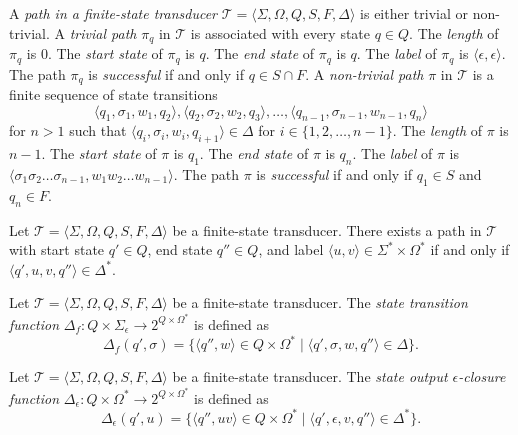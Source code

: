 \begin{definition}
  A \emph{path in a finite-state transducer} $\mathcal{T} = \langle \Sigma, \Omega,
  Q, S, F, \Delta \rangle$ is either trivial or non-trivial. A \emph{trivial path} $\pi_q$
  in $\mathcal{T}$ is associated with every state $q \in Q$. The \emph{length} of $\pi_q$ is
  $0$. The \emph{start state} of $\pi_q$ is $q$. The \emph{end state} of $\pi_q$ is $q$. The \emph{label}
  of $\pi_q$ is $\langle \epsilon, \epsilon \rangle$. The path $\pi_q$ is \emph{successful}
  if and only if $q \in S \cap F$. A \emph{non-trivial path} $\pi$ in $\mathcal{T}$ is a
  finite sequence of state transitions
  \begin{equation*}
    \langle q_1, \sigma_1, w_1, q_2 \rangle, \langle q_2, \sigma_2, w_2, q_3 \rangle,
    \ldots, \langle q_{n-1}, \sigma_{n-1}, w_{n-1}, q_n \rangle
  \end{equation*}
  for $n > 1$ such that $\langle q_i, \sigma_i, w_i, q_{i+1} \rangle \in \Delta$ for
  $i \in \{ 1, 2, \ldots, n-1 \}$. The \emph{length} of $\pi$ is $n-1$. The \emph{start state} of
  $\pi$ is $q_1$. The \emph{end state} of $\pi$ is $q_n$. The \emph{label} of $\pi$ is $\langle
  \sigma_1 \sigma_2 \ldots \sigma_{n-1}, w_1 w_2 \ldots w_{n-1} \rangle$. The path
  $\pi$ is \emph{successful} if and only if $q_1 \in S$ and $q_n \in F$.
\end{definition}

\begin{proposition}
  Let $\mathcal{T} = \langle \Sigma, \Omega, Q, S, F, \Delta \rangle$ be a
  finite-state transducer. There exists a path in $\mathcal{T}$ with start state $q'
  \in Q$, end state $q'' \in Q$, and label $\langle u, v \rangle \in \Sigma^* \times
  \Omega^*$ if and only if $\langle q', u, v, q'' \rangle \in \Delta^*$.
\end{proposition}

\begin{definition}
  Let $\mathcal{T} = \langle \Sigma, \Omega, Q, S, F, \Delta \rangle$ be a
  finite-state transducer. The \emph{state transition function} $\Delta_f : Q \times
  \Sigma_\epsilon \rightarrow 2^{Q \times \Omega^*}$ is defined as
  \begin{equation*}
    \Delta_f(q', \sigma) = \{ \langle q'', w \rangle \in Q \times \Omega^* \mid
    \langle q', \sigma, w, q'' \rangle \in \Delta \}.
  \end{equation*}
\end{definition}

\begin{definition}
  Let $\mathcal{T} = \langle \Sigma, \Omega, Q, S, F, \Delta \rangle$ be a
  finite-state transducer. The \emph{state output $\epsilon$-closure function}
  $\Delta_\epsilon : Q \times \Omega^* \rightarrow 2^{Q \times \Omega^*}$ is defined
  as
  \begin{equation*}
    \Delta_\epsilon(q', u) = \{ \langle q'', uv \rangle \in Q \times \Omega^* \mid
    \langle q', \epsilon, v, q'' \rangle \in \Delta^* \}.
  \end{equation*}
\end{definition}

